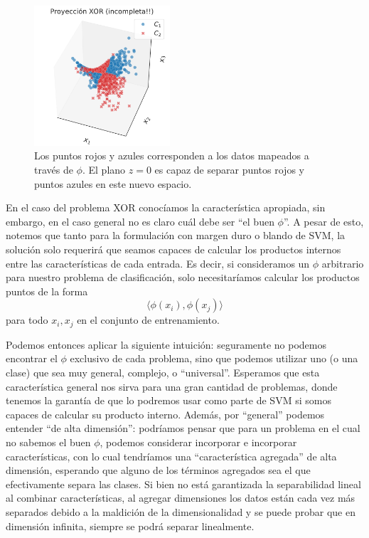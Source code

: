 \begin{figure}[ht]
    \centering
    \includegraphics[width=0.45\textwidth]{img/cap5_xor_3d_proyeccion}
    \caption{Los puntos rojos y azules corresponden a los datos mapeados a través de $\phi$. El plano $z=0$ es capaz de separar puntos rojos y puntos azules en este nuevo espacio.}
    \label{fig:xor_proyectado}
\end{figure}


\begin{remark}
En el caso del problema XOR conocíamos la característica apropiada, sin embargo, en el caso general no es claro cuál debe ser ``el buen $\phi$''. A pesar de esto, notemos que tanto para la formulación con margen duro o blando de SVM, la solución solo requerirá que seamos capaces de calcular los productos internos entre las características de cada entrada. Es decir, si consideramos un $\phi$ arbitrario para nuestro problema de clasificación, solo necesitaríamos calcular los productos puntos de la forma
\begin{equation}
    \langle \phi(x_i) , \phi(x_j) \rangle 
\end{equation}
para todo $x_i,x_j$ en el conjunto de entrenamiento. 
\end{remark}

Podemos entonces aplicar la siguiente intuición: seguramente no podemos encontrar el $\phi$ exclusivo de cada problema, sino que podemos utilizar uno (o una clase) que sea muy general, complejo, o ``universal''. Esperamos que esta característica general nos sirva para una gran cantidad de problemas, donde tenemos la garantía de que lo podremos usar como parte de SVM si somos capaces de calcular su producto interno. Además, por ``general'' podemos entender ``de alta dimensión'': podríamos pensar que para un problema en el cual no sabemos el buen $\phi$, podemos considerar incorporar e incorporar características, con lo cual tendríamos una ``característica agregada'' de alta dimensión, esperando que alguno de los términos agregados sea el que efectivamente separa las clases. Si bien no está garantizada la separabilidad lineal al combinar características, al agregar dimensiones los datos están cada vez más separados debido a la maldición de la dimensionalidad y se puede probar que en dimensión infinita, siempre se podrá separar linealmente.

